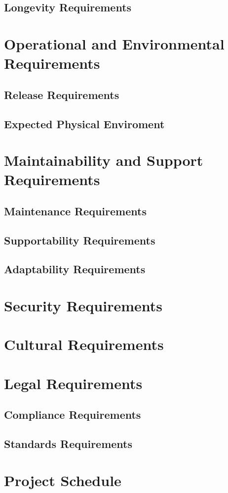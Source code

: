 \documentclass{article}
\begin{document}
\subsection{Longevity Requirements}
\section{Operational and Environmental Requirements}
\subsection{Release Requirements}
\subsection{Expected Physical Enviroment}
\section{Maintainability and Support Requirements}
\subsection{Maintenance Requirements}
\subsection{Supportability Requirements}
\subsection{Adaptability Requirements}
\section{Security Requirements}
\section{Cultural Requirements}
\section{Legal Requirements}
\subsection{Compliance Requirements}
\subsection{Standards Requirements}
\section{Project Schedule}
\end{document}
